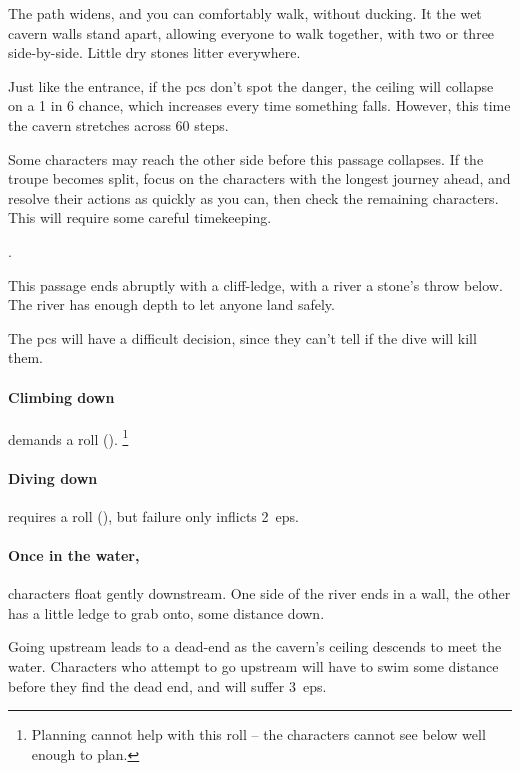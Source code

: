 \begin{multicols}{2}
\begin{boxtext}
  The path widens, and you can comfortably walk, without ducking.
  It the wet cavern walls stand apart, allowing everyone to walk together, with two or three side-by-side.
  Little dry stones litter everywhere.
\end{boxtext}

\caveIn

Just like the entrance, if the \glspl{pc} don't spot the danger, the ceiling will collapse on a 1 in 6 chance, which increases every time something falls.
However, this time the cavern stretches across 60 steps.

Some characters may reach the other side before this passage collapses.
If the troupe becomes split, focus on the characters with the longest journey ahead, and resolve their actions as quickly as you can, then check the remaining characters.
This will require some careful timekeeping.

.


This passage ends abruptly with a cliff-ledge, with a river a stone's throw below.
The river has enough depth to let anyone land safely.

The \glspl{pc} will have a difficult decision, since they can't tell if the dive will kill them.

\paragraph{Climbing down}
demands a  roll (\tn[9]).%
\footnote{Planning cannot help with this roll -- the characters cannot see below well enough to plan.}

\paragraph{Diving down}
requires a  roll (\tn[10]), but failure only inflicts 2~\glspl{ep}.

\paragraph{Once in the water,}
characters float gently downstream.
One side of the river ends in a wall, the other has a little ledge to grab onto, some distance down.

Going upstream leads to a dead-end as the cavern's ceiling descends to meet the water.
Characters who attempt to go upstream will have to swim some distance before they find the dead end, and will suffer 3~\glspl{ep}.


\end{multicols}
